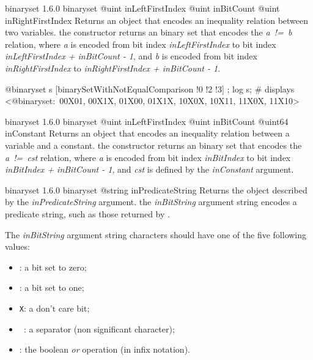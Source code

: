 {binaryset}
{1.6.0}
{binaryset}
{@uint inLeftFirstIndex}
{@uint inBitCount}
{@uint inRightFirstIndex}
{Returns an  object that encodes an inequality relation between two variables.}
{the constructor returns an binary set that encodes the \emph{a~!=~b} relation, where \emph{a} is encoded from bit index \emph{inLeftFirstIndex} to bit index \emph{inLeftFirstIndex  + inBitCount - 1}, and \emph{b} is encoded from bit index \emph{inRightFirstIndex} to \emph{inRightFirstIndex + inBitCount - 1}.}

\exempleDeuxLignes
{}
{@binaryset s [binarySetWithNotEqualComparison !0 !2 !3] ;}
{log s; \# displays <@binaryset:~00X01, 00X1X, 01X00, 01X1X, 10X0X, 10X11, 11X0X, 11X10>}





{binaryset}
{1.6.0}
{binaryset}
{@uint inLeftFirstIndex}
{@uint inBitCount}
{@uint64 inConstant}
{Returns an  object that encodes an inequality relation between a variable and a constant.}
{the constructor returns an binary set that encodes the \emph{a~!=~cst} relation, where \emph {a} is encoded from bit index \emph{inBitIndex} to bit index \emph{inBitIndex  + inBitCount - 1}, and \emph{cst} is defined by the \emph{inConstant} argument.}







{binaryset}
{1.6.0}
{binaryset}
{@string inPredicateString}
{Returns the  object described by the \emph{inPredicateString} argument.}
{the \emph{inBitString} argument string encodes a predicate string, such as those returned by .}
\begin{description}
\item The \emph{inBitString} argument string characters should have one of the five following values:
\begin{itemize}
\item \texttt{\textquotesingle}: a bit set to zero;
\item \texttt{\textquotesingle}: a bit set to one;
\item \texttt{\textquotesingle X\textquotesingle}: a don't care bit;
\item \texttt{\textquotesingle~\textquotesingle}: a separator (non significant character);
\item \texttt{\textquotesingle\textbar\textquotesingle}: the boolean \emph{or} operation (in infix notation).
\end{itemize}
\end{description}


